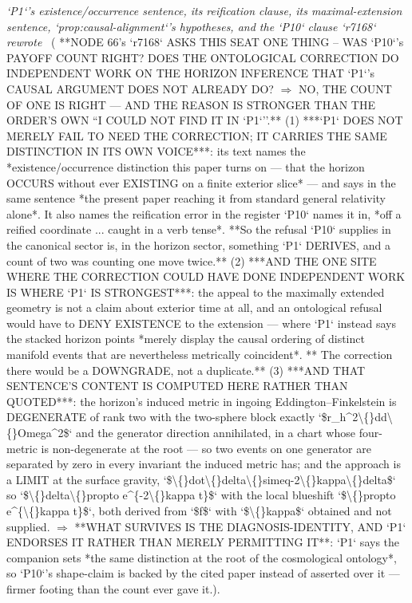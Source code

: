 \begin{description}
\textit{`P1`'s existence/occurrence sentence, its reification clause, its maximal-extension sentence, `prop:causal-alignment`'s hypotheses, and the `P10` clause `r7168` rewrote} \ ( **NODE 66's `r7168` ASKS THIS SEAT ONE THING -- WAS `P10`'s PAYOFF COUNT RIGHT? DOES THE ONTOLOGICAL CORRECTION DO INDEPENDENT WORK ON THE HORIZON INFERENCE THAT `P1`'s CAUSAL ARGUMENT DOES NOT ALREADY DO? \ensuremath{\Rightarrow} NO, THE COUNT OF ONE IS RIGHT --- AND THE REASON IS STRONGER THAN THE ORDER'S OWN ``I COULD NOT FIND IT IN `P1`''.** (1) ***`P1` DOES NOT MERELY FAIL TO NEED THE CORRECTION; IT CARRIES THE SAME DISTINCTION IN ITS OWN VOICE***: its text names the *existence/occurrence distinction this paper turns on --- that the horizon OCCURS without ever EXISTING on a finite exterior slice* --- and says in the same sentence *the present paper reaching it from standard general relativity alone*. It also names the reification error in the register `P10` names it in, *off a reified coordinate ... caught in a verb tense*. **So the refusal `P10` supplies in the canonical sector is, in the horizon sector, something `P1` DERIVES, and a count of two was counting one move twice.** (2) ***AND THE ONE SITE WHERE THE CORRECTION COULD HAVE DONE INDEPENDENT WORK IS WHERE `P1` IS STRONGEST***: the appeal to the maximally extended geometry is not a claim about exterior time at all, and an ontological refusal would have to DENY EXISTENCE to the extension --- where `P1` instead says the stacked horizon points *merely display the causal ordering of distinct manifold events that are nevertheless metrically coincident*. ** The correction there would be a DOWNGRADE, not a duplicate.** (3) ***AND THAT SENTENCE'S CONTENT IS COMPUTED HERE RATHER THAN QUOTED***: the horizon's induced metric in ingoing Eddington--Finkelstein is DEGENERATE of rank two with the two-sphere block exactly `\$r\_h\textasciicircum{}2\textbackslash\{\}dd\textbackslash\{\}Omega\textasciicircum{}2\$` and the generator direction annihilated, in a chart whose four-metric is non-degenerate at the root --- so two events on one generator are separated by zero in every invariant the induced metric has; and the approach is a LIMIT at the surface gravity, `\$\textbackslash\{\}dot\textbackslash\{\}delta\textbackslash\{\}simeq-2\textbackslash\{\}kappa\textbackslash\{\}delta\$` so `\$\textbackslash\{\}delta\textbackslash\{\}propto e\textasciicircum{}\{-2\textbackslash\{\}kappa t\}\$` with the local blueshift `\$\textbackslash\{\}propto e\textasciicircum{}\{\textbackslash\{\}kappa t\}\$`, both derived from `\$f\$` with `\$\textbackslash\{\}kappa\$` obtained and not supplied. \ensuremath{\Rightarrow} **WHAT SURVIVES IS THE DIAGNOSIS-IDENTITY, AND `P1` ENDORSES IT RATHER THAN MERELY PERMITTING IT**: `P1` says the companion sets *the same distinction at the root of the cosmological ontology*, so `P10`'s shape-claim is backed by the cited paper instead of asserted over it --- firmer footing than the count ever gave it.). 

\end{description}
